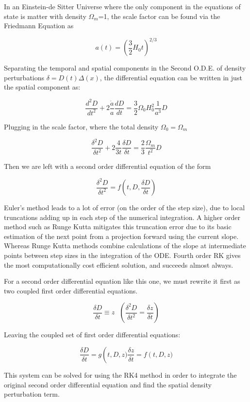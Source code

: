 


In an Einstein-de Sitter Universe where the only component in the equations of state is matter with density $\Omega_m$=1, the scale factor can be found via the Friedmann Equation as

\begin{equation}
  a(t) = \left(\frac{3}{2}H_0t\right)^{2/3}
\end{equation}

Separating the temporal and spatial components in the Second O.D.E. of density perturbations $\delta = D(t)\Delta(x)$, the differential equation can be written in just the spatial component as:

\begin{equation}
  \frac{d^2D}{dt^2}+2\frac{\dot{a}}{a}\frac{dD}{dt}=\frac{3}{2}\Omega_0H_0^2\frac{1}{a^3}D
\end{equation}

Plugging in the scale factor, where the total density $\Omega_0 = \Omega_m$

\begin{equation}
  \frac{\delta^2D}{\delta t^2}+2\frac{4}{3t}\frac{\delta D}{\delta t}=\frac{2}{3}\frac{\Omega_m}{t^2}D
\end{equation}

Then we are left with a second order differential equation of the form

\begin{equation}
  \frac{\delta^2D}{\delta t^2}=f\left(t,D,\frac{\delta D}{\delta t}\right)
\end{equation}

Euler's method leads to a lot of error (on the order of the step size),  due to local truncations adding up in each step of the numerical integration. A higher order method such as Runge Kutta mitigates this truncation error due to its basic estimation of the next point from a projection forward using the current slope. Whereas Runge Kutta methods combine calculations of the slope at intermediate points between step sizes in the integration of the ODE. Fourth order RK gives the most computationally cost efficient solution, and succeeds almost always.

For a second order differential equation like this one, we must rewrite it first as two coupled first order differential equations. 

\begin{equation}
  \frac{\delta D}{\delta t} \equiv z \text{   } \left(\frac{\delta^2D}{\delta t^2} = \frac{\delta z}{\delta t}\right)
\end{equation}

Leaving the coupled set of first order differential equations:

\begin{equation}
  \frac{\delta D}{\delta t} = g\left(t,D,z)
  \frac{\delta z}{\delta t} = f\left(t,D,z)
\end{equation}


This system can be solved for using the RK4 method in order to integrate the original second order differential equation and find the spatial density perturbation term.